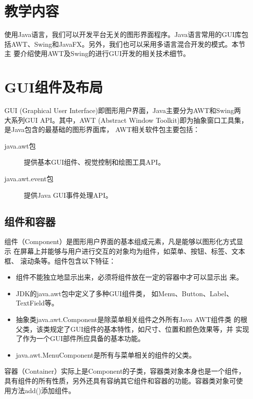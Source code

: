 \newpage
\section*{教学内容}
\sline

使用Java语言，我们可以开发平台无关的图形界面程序。Java语言常用的GUI库包
括AWT、Swing和JavaFX。另外，我们也可以采用多语言混合开发的模式。本节主
要介绍使用AWT及Swing的进行GUI开发的相关技术细节。

\section{GUI组件及布局}

GUI (Graphical User Interface)即图形用户界面，Java主要分为AWT和Swing两
大系列GUI API。其中，AWT (Abstract Window Toolkit)即为抽象窗口工具集，
是Java包含的最基础的图形界面库， AWT相关软件包主要包括：

\begin{description}
\item[java.awt包] 提供基本GUI组件、视觉控制和绘图工具API。
\item[java.awt.event包] 提供Java GUI事件处理API。
\end{description}

\subsection{组件和容器}
  
组件（Component）是图形用户界面的基本组成元素，凡是能够以图形化方式显示
在屏幕上并能够与用户进行交互的对象均为组件，如菜单、按钮、标签、文本框、
滚动条等。组件包含以下特征：

\begin{itemize}\kai
\item 组件不能独立地显示出来，必须将组件放在一定的容器中才可以显示出
  来。
\item JDK的java.awt包中定义了多种GUI组件类，
  如Menu、Button、Label、TextField等。
\item 抽象类java.awt.Component是除菜单相关组件之外所有Java AWT组件类
  的根父类，该类规定了GUI组件的基本特性，如尺寸、位置和颜色效果等，并
  实现了作为一个GUI部件所应具备的基本功能。
\item java.awt.MenuComponent是所有与菜单相关的组件的父类。
\end{itemize}
  
容器（Container）实际上是Component的子类，容器类对象本身也是一个组件，
具有组件的所有性质，另外还具有容纳其它组件和容器的功能。容器类对象可使
用方法add()添加组件。


